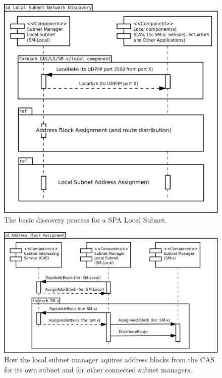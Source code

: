 \begin{figure}[h]
    \centering
    \includegraphics[width=\textwidth]{figures/vn_local_subnet_network_discovery}
    \caption{The basic discovery process for a SPA Local Subnet.}
    \label{fig:appendix_vn_local_subnet_network_discovery}
\end{figure}

\begin{figure}[h]
    \centering
    \includegraphics[width=\textwidth]{figures/vn_address_block_assignment}
    \caption{How the local subnet manager aquires address blocks from the CAS
    for its own subnet and for other connected subnet managers.}
    \label{fig:appendix_vn_address_block_assignment}
\end{figure}

